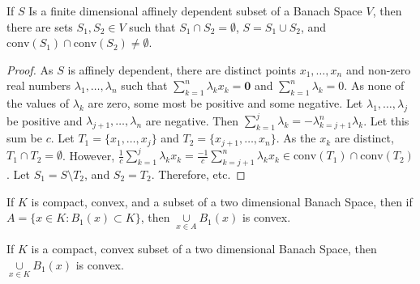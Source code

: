 \documentclass[crop=false,class=book]{standalone}
\begin{document}
\begin{theorem}
If $S$ Is a finite dimensional affinely dependent subset of a Banach Space $V$, then there are sets $S_1,S_2\in V$ such that $S_1\cap S_2 = \emptyset$, $S=S_1\cup S_2$, and $\textrm{conv}(S_1)\cap \textrm{conv}(S_2) \ne \emptyset$.
\end{theorem}
\begin{proof}
As $S$ is affinely dependent, there are distinct points $x_1,\hdots,x_n$ and non-zero real numbers $\lambda_1,\hdots,\lambda_n$ such that $\sum_{k=1}^{n}\lambda_k x_k= \mathbf{0}$ and $\sum_{k=1}^{n}\lambda_k = 0$. As none of the values of $\lambda_k$ are zero, some most be positive and some negative. Let $\lambda_1,\hdots, \lambda_j$ be positive and $\lambda_{j+1},\hdots, \lambda_n$ are negative. Then $\sum_{k=1}^{j} \lambda_k = - \lambda_{k=j+1}^{n}\lambda_k$. Let this sum be $c$. Let $T_1 = \{x_1,\hdots, x_j\}$ and $T_2=\{x_{j+1},\hdots, x_{n}\}$. As the $x_k$ are distinct, $T_1\cap T_2 = \emptyset$. However, $\frac{1}{c}\sum_{k=1}^{j}\lambda_k x_k = \frac{-1}{c}\sum_{k=j+1}^{n} \lambda_k x_k \in\textrm{conv}(T_1)\cap \textrm{conv}(T_2)$. Let $S_1 = S\setminus T_2$, and $S_2 = T_2$. Therefore, etc.
\end{proof}
\begin{theorem}
If $K$ is compact, convex, and a subset of a two dimensional Banach Space, then if $A = \{x\in K:B_{1}(x)\subset K\}$, then $\underset{x\in A}\cup B_{1}(x)$ is convex.
\end{theorem}
\begin{theorem}
If $K$ is a compact, convex subset of a two dimensional Banach Space, then $\underset{x\in K}\cup B_{1}(x)$ is convex.
\end{theorem}
\end{document}
